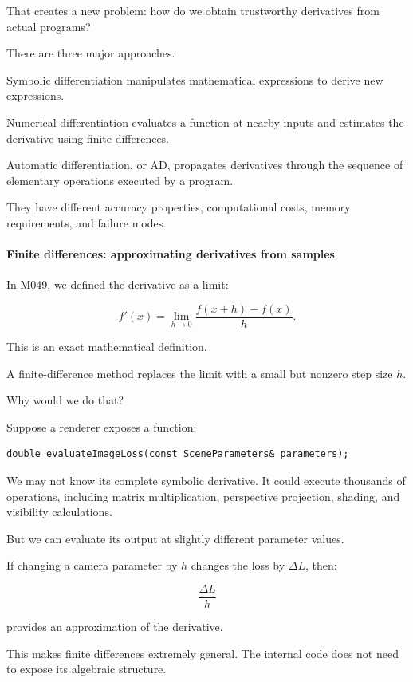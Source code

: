 That creates a new problem: how do we obtain trustworthy derivatives from actual programs?

There are three major approaches.

Symbolic differentiation manipulates mathematical expressions to derive new expressions.

Numerical differentiation evaluates a function at nearby inputs and estimates the derivative using finite differences.

Automatic differentiation, or AD, propagates derivatives through the sequence of elementary operations executed by a program.

They have different accuracy properties, computational costs, memory requirements, and failure modes.

\paragraph{Finite differences: approximating derivatives from samples}\label{02-foundations-ii-ch025-finite-differences-approximating-derivatives-from-samples}

In M049, we defined the derivative as a limit:

\[
f'(x)= \lim_{h\to0} \frac{f(x+h)-f(x)}h.
\]

This is an exact mathematical definition.

A finite-difference method replaces the limit with a small but nonzero step size \(h\).

Why would we do that?

Suppose a renderer exposes a function:

\begin{verbatim}
double evaluateImageLoss(const SceneParameters& parameters);
\end{verbatim}

We may not know its complete symbolic derivative. It could execute thousands of operations, including matrix multiplication, perspective projection, shading, and visibility calculations.

But we can evaluate its output at slightly different parameter values.

If changing a camera parameter by \(h\) changes the loss by \(\Delta L\), then:

\[
\frac{\Delta L}{h}
\]

provides an approximation of the derivative.

This makes finite differences extremely general. The internal code does not need to expose its algebraic structure.

